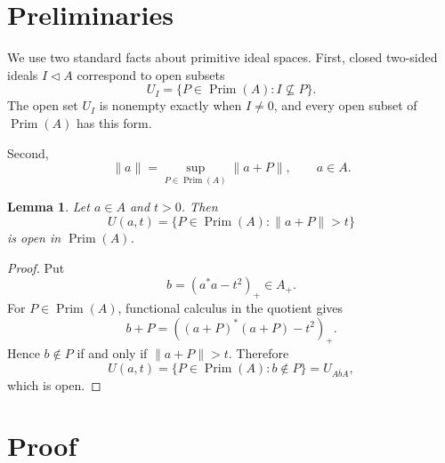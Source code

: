 \documentclass[11pt]{article}
\newtheorem{lemma}{Lemma}
\newcommand{\Prim}{\operatorname{Prim}}
\begin{document}
\section*{Preliminaries}

We use two standard facts about primitive ideal spaces.  First, closed
two-sided ideals \(I\triangleleft A\) correspond to open subsets
\[
        U_I=\{P\in\Prim(A): I\not\subseteq P\}.
\]
The open set \(U_I\) is nonempty exactly when \(I\ne0\), and every open subset
of \(\Prim(A)\) has this form.

Second,
\[
        \|a\|=\sup_{P\in\Prim(A)}\|a+P\|,\qquad a\in A.
\]

\begin{lemma}
\label{lem:near-norm-open}
Let \(a\in A\) and \(t>0\).  Then
\[
        U(a,t)=\{P\in\Prim(A):\|a+P\|>t\}
\]
is open in \(\Prim(A)\).
\end{lemma}

\begin{proof}
Put
\[
        b=(a^*a-t^2)_+\in A_+.
\]
For \(P\in\Prim(A)\), functional calculus in the quotient gives
\[
        b+P=( (a+P)^*(a+P)-t^2)_+.
\]
Hence \(b\notin P\) if and only if \(\|a+P\|>t\).  Therefore
\[
        U(a,t)=\{P\in\Prim(A): b\notin P\}=U_{\overline{AbA}},
\]
which is open.
\end{proof}

\section*{Proof}
\end{document}
